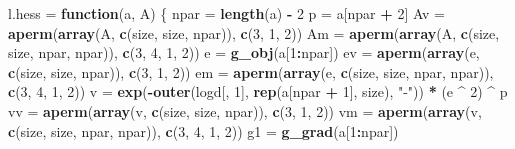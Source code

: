 \documentclass[]{article}
\newenvironment{Shaded}{\begin{snugshade}}{\end{snugshade}}
\newcommand{\ControlFlowTok}[1]{\textcolor[rgb]{0.13,0.29,0.53}{\textbf{#1}}}
\newcommand{\DecValTok}[1]{\textcolor[rgb]{0.00,0.00,0.81}{#1}}
\newcommand{\KeywordTok}[1]{\textcolor[rgb]{0.13,0.29,0.53}{\textbf{#1}}}
\newcommand{\NormalTok}[1]{#1}
\newcommand{\OperatorTok}[1]{\textcolor[rgb]{0.81,0.36,0.00}{\textbf{#1}}}
\newcommand{\StringTok}[1]{\textcolor[rgb]{0.31,0.60,0.02}{#1}}
\begin{document}
\begin{Shaded}
\begin{Highlighting}[]
\NormalTok{l.hess =}\StringTok{ }\ControlFlowTok{function}\NormalTok{(a, A) \{}
\NormalTok{  npar =}\StringTok{ }\KeywordTok{length}\NormalTok{(a) }\OperatorTok{-}\StringTok{ }\DecValTok{2}
\NormalTok{  p =}\StringTok{ }\NormalTok{a[npar }\OperatorTok{+}\StringTok{ }\DecValTok{2}\NormalTok{]}
\NormalTok{  Av =}\StringTok{ }\KeywordTok{aperm}\NormalTok{(}\KeywordTok{array}\NormalTok{(A, }\KeywordTok{c}\NormalTok{(size, size, npar)), }\KeywordTok{c}\NormalTok{(}\DecValTok{3}\NormalTok{, }\DecValTok{1}\NormalTok{, }\DecValTok{2}\NormalTok{))}
\NormalTok{  Am =}\StringTok{ }\KeywordTok{aperm}\NormalTok{(}\KeywordTok{array}\NormalTok{(A, }\KeywordTok{c}\NormalTok{(size, size, npar, npar)), }\KeywordTok{c}\NormalTok{(}\DecValTok{3}\NormalTok{, }\DecValTok{4}\NormalTok{, }\DecValTok{1}\NormalTok{, }\DecValTok{2}\NormalTok{))}
\NormalTok{  e =}\StringTok{ }\KeywordTok{g_obj}\NormalTok{(a[}\DecValTok{1}\OperatorTok{:}\NormalTok{npar])}
\NormalTok{  ev =}\StringTok{ }\KeywordTok{aperm}\NormalTok{(}\KeywordTok{array}\NormalTok{(e, }\KeywordTok{c}\NormalTok{(size, size, npar)), }\KeywordTok{c}\NormalTok{(}\DecValTok{3}\NormalTok{, }\DecValTok{1}\NormalTok{, }\DecValTok{2}\NormalTok{))}
\NormalTok{  em =}\StringTok{ }\KeywordTok{aperm}\NormalTok{(}\KeywordTok{array}\NormalTok{(e, }\KeywordTok{c}\NormalTok{(size, size, npar, npar)), }\KeywordTok{c}\NormalTok{(}\DecValTok{3}\NormalTok{, }\DecValTok{4}\NormalTok{, }\DecValTok{1}\NormalTok{, }\DecValTok{2}\NormalTok{))}
\NormalTok{  v =}\StringTok{ }\KeywordTok{exp}\NormalTok{(}\OperatorTok{-}\KeywordTok{outer}\NormalTok{(logd[, }\DecValTok{1}\NormalTok{], }\KeywordTok{rep}\NormalTok{(a[npar }\OperatorTok{+}\StringTok{ }\DecValTok{1}\NormalTok{], size), }\StringTok{"-"}\NormalTok{)) }\OperatorTok{*}\StringTok{ }\NormalTok{(e }\OperatorTok{^}\StringTok{ }\DecValTok{2}\NormalTok{) }\OperatorTok{^}\StringTok{ }\NormalTok{p}
\NormalTok{  vv =}\StringTok{ }\KeywordTok{aperm}\NormalTok{(}\KeywordTok{array}\NormalTok{(v, }\KeywordTok{c}\NormalTok{(size, size, npar)), }\KeywordTok{c}\NormalTok{(}\DecValTok{3}\NormalTok{, }\DecValTok{1}\NormalTok{, }\DecValTok{2}\NormalTok{))}
\NormalTok{  vm =}\StringTok{ }\KeywordTok{aperm}\NormalTok{(}\KeywordTok{array}\NormalTok{(v, }\KeywordTok{c}\NormalTok{(size, size, npar, npar)), }\KeywordTok{c}\NormalTok{(}\DecValTok{3}\NormalTok{, }\DecValTok{4}\NormalTok{, }\DecValTok{1}\NormalTok{, }\DecValTok{2}\NormalTok{))}
\NormalTok{  g1 =}\StringTok{ }\KeywordTok{g_grad}\NormalTok{(a[}\DecValTok{1}\OperatorTok{:}\NormalTok{npar])}

\end{Highlighting}
\end{Shaded}
\end{document}
